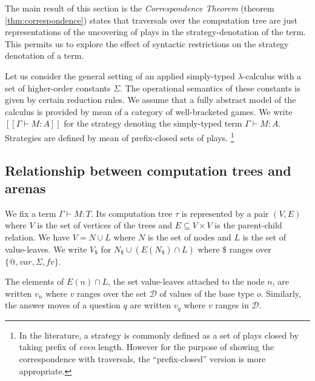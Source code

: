 \documentclass{llncs}
\newcommand\inter{\cap}
\newcommand\union{\cup}
\newcommand{\sem}[1]{{[\![ #1 ]\!]}}
\begin{document}
The main result of this section is the
\emph{Correspondence Theorem} (theorem \ref{thm:correspondence})
states that traversals over the computation tree are just
representations of the uncovering of plays in the
strategy-denotation of the term.  This permits us
to explore the effect of syntactic restrictions on the strategy denotation of a term.

Let us consider the general setting of an applied simply-typed $\lambda$-calculus with a set of higher-order constants $\Sigma$. The operational semantics of these constants is given by certain reduction rules.
We assume that a fully abstract model of the calculus is provided by mean of a category of well-bracketed games.
We write $\sem{\Gamma \vdash M : A}$ for the strategy denoting the simply-typed term
$\Gamma \vdash M : A$. Strategies are defined by mean of prefix-closed sets of plays.
\footnote{In the literature, a strategy is commonly defined as a set of plays
closed by taking prefix of \emph{even} length. However for the purpose of showing the correspondence with traversals, the ``prefix-closed'' version is more appropriate.}


\subsection{Relationship between computation trees and arenas}
We fix a term $\Gamma \vdash M : T$. Its computation tree $\tau$
is represented by a pair $(V,E)$ where $V$ is the set of vertices of
the trees and $E \subseteq V \times V$ is the parent-child relation. We have $V = N \union L$ where $N$ is the set of nodes and $L$ is the set of value-leaves.
We write $V_\$$  for $N_\$ \union (E(N_\$) \inter L) $ where $\$$ ranges over $\{@, var, \Sigma, fv \}$.


The elements of $E(n) \inter L$, the set value-leaves attached to the node $n$, are
written $v_n$ where $ v$ ranges over the set $\mathcal{D}$ of values of the base type $o$.
Similarly, the answer moves of a question $q$ are written $v_q$ where $v$ ranges in $\mathcal{D}$.
\end{document}
